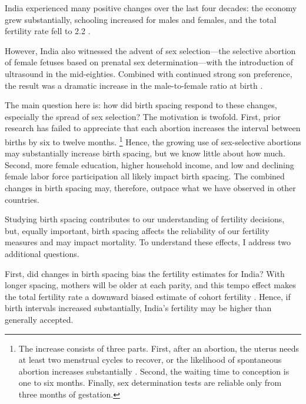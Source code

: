 \documentclass[12pt,letterpaper]{article}
\begin{document}


India experienced many positive changes over the last four decades:
the economy grew substantially,
schooling increased for males and females,
and the total fertility rate fell to 2.2 
\citep{Bosworth2008,Dharmalingam2014,
International-Institute-for-Population-Sciences-IIPS2017}.

However, India also witnessed the advent of sex selection---the selective abortion of 
female fetuses based on prenatal sex determination---with the introduction of ultrasound 
in the mid-eighties.
Combined with continued strong son preference, the result was a dramatic increase in the 
male-to-female ratio at birth
\citep{das_gupta97,Arnold2002,retherford03b,Guilmoto2012,Portner2015b,Jayachandran2017}.


The main question here is: how did birth spacing respond to these changes, especially 
the spread of sex selection? 
The motivation is twofold.
First, prior research has failed to appreciate that each abortion increases the
interval between births by six to twelve months.%
\footnote{
The increase consists of three parts. 
First, after an abortion, the uterus needs at least two menstrual cycles to recover, 
or the likelihood of spontaneous abortion increases substantially \citep{zhou00b}. 
Second, the waiting time to conception is one to six months. 
Finally, sex determination tests are reliable only from three months of gestation. 
}
Hence, the growing use of sex-selective abortions may substantially increase birth spacing, 
but we know little about how much. 
Second, more female education, higher household income, and low and declining female labor 
force participation all likely impact birth spacing. 
The combined changes in birth spacing may, therefore, outpace what we have observed in 
other countries.

Studying birth spacing contributes to our understanding of fertility decisions, but, equally 
important, birth spacing affects the reliability of our fertility measures and may 
impact mortality. 
To understand these effects, I address two additional questions. 

First, did changes in birth spacing bias the fertility estimates for India? 
With longer spacing, mothers will be older at each parity, and this tempo effect makes the 
total fertility rate a downward biased estimate of cohort fertility
\citep{Hotz1997,Bongaarts1999,Ni-Bhrolchain2011}. 
Hence, if birth intervals increased substantially, India's fertility may be higher 
than generally accepted.
\end{document}
